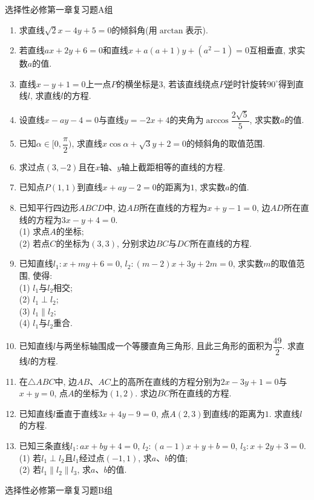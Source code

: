 \documentclass[10pt,a4paper]{article}
\begin{document}
选择性必修第一章复习题A组

\begin{enumerate}[1.]
\item 求直线$\sqrt 2x-4y+5=0$的倾斜角(用$\arctan$表示).
\item 若直线$ax+2y+6=0$和直线$x+a(a+1)y+(a^2-1)=0$互相垂直, 求实数$a$的值.
\item 直线$x-y+1=0$上一点$P$的横坐标是$3$, 若该直线绕点$P$逆时针旋转$90^\circ$得到直线$l$, 求直线$l$的方程.
\item 设直线$x-ay-4=0$与直线$y=-2x+4$的夹角为$\arccos \dfrac{2\sqrt 5}5$, 求实数$a$的值.
\item 已知$\alpha\in [0, \dfrac\pi 2)$, 求直线$x\cos \alpha+\sqrt 3y+2=0$的倾斜角的取值范围.
\item 求过点$(3, -2)$且在$x$轴、$y$轴上截距相等的直线的方程.
\item 已知点$P(1, 1)$到直线$x+ay-2=0$的距离为$1$, 求实数$a$的值.
\item 已知平行四边形$ABCD$中, 边$AB$所在直线的方程为$x+y-1=0$, 边$AD$所在直线的方程为$3x-y+4=0$.\\
(1) 求点$A$的坐标;\\
(2) 若点$C$的坐标为$(3, 3)$, 分别求边$BC$与$DC$所在直线的方程.
\item 已知直线$l_1: x+my+6=0$, $l_2: (m-2)x+3y+2m=0$, 求实数$m$的取值范围, 使得:\\
(1) $l_1$与$l_2$相交;\\
(2) $l_1\perp l_2$;\\
(3) $l_1\parallel l_2$;\\
(4) $l_1$与$l_2$重合.
\item 已知直线$l$与两坐标轴围成一个等腰直角三角形, 且此三角形的面积为$\dfrac{49}2$. 求直线$l$的方程.
\item 在$\triangle ABC$中, 边$AB$、$AC$上的高所在直线的方程分别为$2x-3y+1=0$与$x+y=0$, 点$A$的坐标为$(1, 2)$. 求边$BC$所在直线的方程.
\item 已知直线$l$垂直于直线$3x+4y-9=0$, 点$A(2, 3)$到直线$l$的距离为$1$. 求直线$l$的方程.
\item 已知三条直线$l_1: ax+by+4=0$, $l_2: (a-1)x+y+b=0$, $l_3: x+2y+3=0$.\\
(1) 若$l_1\perp l_2$且$l_1$经过点$(-1, 1)$, 求$a$、$b$的值;\\
(2) 若$l_1\parallel l_2\parallel l_3$, 求$a$、$b$的值.
\end{enumerate}

选择性必修第一章复习题B组
\end{document}
